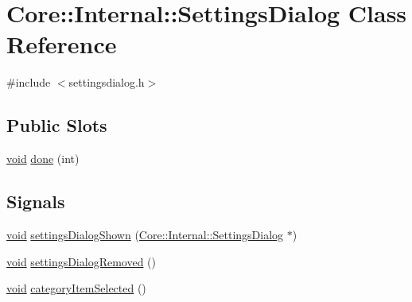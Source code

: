 \hypertarget{class_core_1_1_internal_1_1_settings_dialog}{\section{\-Core\-:\-:\-Internal\-:\-:\-Settings\-Dialog \-Class \-Reference}
\label{class_core_1_1_internal_1_1_settings_dialog}
}


{\ttfamily \#include $<$settingsdialog.\-h$>$}

\subsection*{\-Public \-Slots}
\begin{DoxyCompactItemize}
\item 
\hyperlink{group___u_a_v_objects_plugin_ga444cf2ff3f0ecbe028adce838d373f5c}{void} \hyperlink{group___core_plugin_ga33b9b65180d536d1a0f4f8724ed7af49}{done} (int)
\end{DoxyCompactItemize}
\subsection*{\-Signals}
\begin{DoxyCompactItemize}
\item 
\hyperlink{group___u_a_v_objects_plugin_ga444cf2ff3f0ecbe028adce838d373f5c}{void} \hyperlink{group___core_plugin_ga8a8645a21b87f0611a5eef4f80c27994}{settings\-Dialog\-Shown} (\hyperlink{class_core_1_1_internal_1_1_settings_dialog}{\-Core\-::\-Internal\-::\-Settings\-Dialog} $\ast$)
\item 
\hyperlink{group___u_a_v_objects_plugin_ga444cf2ff3f0ecbe028adce838d373f5c}{void} \hyperlink{group___core_plugin_ga5971587cfd354992977a6a7c7ea675ec}{settings\-Dialog\-Removed} ()
\item 
\hyperlink{group___u_a_v_objects_plugin_ga444cf2ff3f0ecbe028adce838d373f5c}{void} \hyperlink{group___core_plugin_ga3134c817d597c2b8915c4648aa70528b}{category\-Item\-Selected} ()
\end{DoxyCompactItemize}
